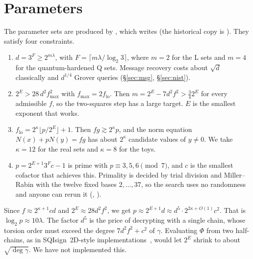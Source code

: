 \section{Parameters}\label{sec:params}

The parameter sets are produced by ,
which writes  (the historical copy is
). They satisfy four constraints.
\begin{enumerate}
\item[(P1)] $d=3^F\ge 2^{m\lambda}$, with $F=\lceil m\lambda/\log_2 3\rceil$, where
  $m=2$ for the L sets and $m=4$ for the quantum-hardened Q sets.
  Message recovery costs about $\sqrt d$ classically and $d^{1/4}$ Grover
  queries (\S\ref{sec:msg}, \S\ref{sec:nist}).
\item[(P2)] $2^E>28\,d^2f_{\max}^2$ with $f_{\max}=2f_{\mathrm{lo}}$. Then
  $m=2^E-7d^2f^2>\tfrac34 2^E$ for every admissible $f$, so the two-squares
  step has a large target. $E$ is the smallest exponent that works.
\item[(P3)] $f_{\mathrm{lo}}=2^\kappa\lfloor p/2^E\rfloor+1$. Then
  $fg\gtrsim 2^\kappa p$, and the norm equation $N(x)+pN(y)=fg$ has about
  $2^\kappa$ candidate values of $y\ne0$. We take $\kappa=12$ for the real sets
  and $\kappa=8$ for the toys.
\item[(P4)] $p=2^{E+1}3^Fc-1$ is prime with $p\equiv3,5,6\pmod7$, and $c$ is the
  smallest cofactor that achieves this. Primality is decided by trial
  division and Miller--Rabin with the twelve fixed bases $2,\dots,37$, so
  the search uses no randomness and anyone can rerun it
  (, ).
\end{enumerate}

Since $f\approx 2^{\kappa+1}cd$ and $2^E\approx 28d^2f^2$, we get
$p\approx 2^{E+1}d\approx d^5\cdot 2^{2\kappa+O(1)}c^2$. That is
$\log_2p\approx 10\lambda$. The factor $d^5$ is the price of decrypting with
a single chain, whose torsion order must exceed the degree $7d^2f^2+c^2$ of
$\gamma$. Evaluating $\Phi$ from two half-chains, as in SQIsign~2D-style
implementations~\cite{DMPR23}, would let $2^E$ shrink to about
$\sqrt{\deg\gamma}$. We have not implemented this.

